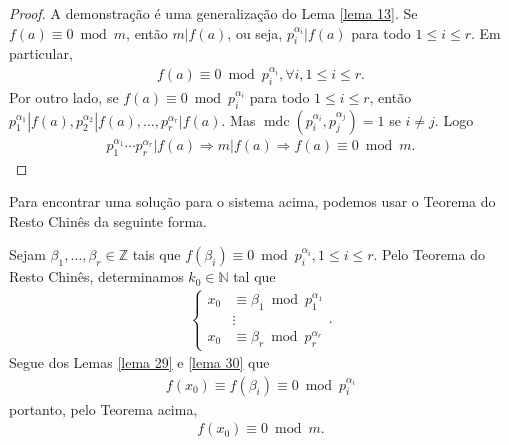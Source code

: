 \documentclass[a4paper,11pt,twoside, leqno]{article}
\DeclareMathOperator{\mdc}{mdc}
\theoremstyle{definition}
\begin{document}
\begin{proof}
	A demonstração é uma generalização do Lema \eqref{lema 13}. Se $f(a)\equiv 0\bmod m$, então $m|f(a)$, ou seja, $p_i^{\alpha_i}|f(a)$ para todo $1\leq i\leq r$. Em particular,
	\begin{align*}
	f(a)\equiv 0\bmod p_i^{\alpha_i}, \forall i, 1\leq i\leq r.
	\end{align*}
	Por outro lado, se $f(a)\equiv 0\bmod p_i^{\alpha_i}$ para todo $1\leq i\leq r$, então $p_1^{\alpha_1}|f(a), p_2^{\alpha_2}|f(a), \dots, p_r^{\alpha_r}|f(a)$. Mas $\mdc(p_i^{\alpha_i}, p_j^{\alpha_j}) = 1$ se $i\neq j$. Logo
	\begin{align*}
	p_1^{\alpha_1}\cdots p_r^{\alpha_r}|f(a) \Rightarrow m|f(a) \Rightarrow f(a)\equiv 0\bmod m.
	\end{align*}
\end{proof}
Para encontrar uma solução para o sistema acima, podemos usar o Teorema do Resto Chinês da seguinte forma.
\par\vspace{0.3cm} Sejam $\beta_1, \dots, \beta_r\in\mathbb{Z}$ tais que $f(\beta_i) \equiv 0\bmod p_i^{\alpha_i}, 1\leq i\leq r$. Pelo Teorema do Resto Chinês, determinamos $k_0\in\mathbb{N}$ tal que
\begin{align*}
\begin{cases}
x_0&\equiv \beta_1\bmod p_1^{\alpha_1} \\
&\vdots \\
x_0&\equiv \beta_r\bmod p_r^{\alpha_r} 
\end{cases}.
\end{align*}
Segue dos Lemas \eqref{lema 29} e \eqref{lema 30} que 
\begin{align*}
f(x_0) \equiv f(\beta_i)\equiv 0\bmod p_i^{\alpha_i}
\end{align*} 
portanto, pelo Teorema acima,
\begin{align*}
f(x_0) \equiv 0\bmod m.
\end{align*}
\end{document}

